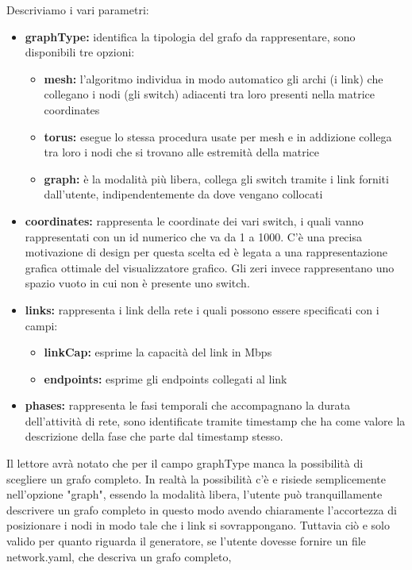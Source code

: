 \documentclass[binding=0.6cm]{sapthesis}
\begin{document}
Descriviamo i vari parametri:
\begin{itemize}
    \item \textbf{graphType:} identifica la tipologia del grafo da rappresentare, sono disponibili tre opzioni:
    \begin{itemize}
        \item \textbf{mesh:} l'algoritmo individua in modo automatico gli archi (i link) che collegano i nodi (gli switch) adiacenti tra loro presenti nella matrice coordinates
        \item \textbf{torus:} esegue lo stessa procedura usate per mesh e in addizione collega tra loro i nodi che si trovano alle estremità della matrice
        \item \textbf{graph:} è la modalità più libera, collega gli switch tramite i link forniti dall'utente, indipendentemente da dove vengano collocati
    \end{itemize}
    \item \textbf{coordinates:} rappresenta le coordinate dei vari switch, i quali vanno rappresentati con un id numerico che va da 1 a 1000. C'è una precisa motivazione di design per questa scelta ed è legata a una rappresentazione grafica ottimale del visualizzatore grafico. Gli zeri invece rappresentano uno spazio vuoto in cui non è presente uno switch.
    \item \textbf{links:} rappresenta i link della rete i quali possono essere specificati con i campi:
    \begin{itemize}
        \item \textbf{linkCap:} esprime la capacità del link in Mbps
        \item \textbf{endpoints:} esprime gli endpoints collegati al link
    \end{itemize}
    \item \textbf{phases:} rappresenta le fasi temporali che accompagnano la durata dell'attività di rete, sono identificate tramite timestamp che ha come valore la descrizione della fase che parte dal timestamp stesso.
\end{itemize}
Il lettore avrà notato che per il campo graphType manca la possibilità di scegliere un grafo completo. In realtà la possibilità c'è e risiede semplicemente
nell'opzione "graph", essendo la modalità libera, l'utente può tranquillamente descrivere un grafo completo in questo modo avendo chiaramente l'accortezza di posizionare i nodi in modo tale che i link si sovrappongano.
Tuttavia ciò e solo valido per quanto riguarda il generatore, se l'utente dovesse fornire un file network.yaml, che descriva un grafo completo,
\end{document}
